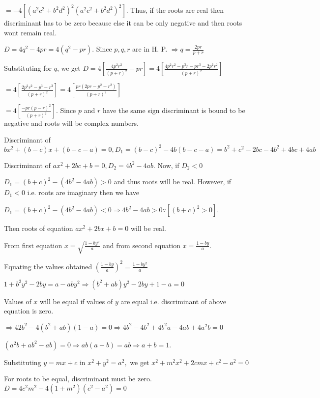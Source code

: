   $= -4[(a^2c^2 + b^2d^2)^2(a^2c^2 + b^2d^2)^2]$. Thus, if the roots are real then discriminant has to be
  zero because else it can be only negative and then roots wont remain real.
\item $D = 4q^2 - 4pr = 4(q^2 - pr)$. Since $p, q, r$ are in H. P. $\Rightarrow q = \frac{2pr}{p + r}$

  Substituting for $q$, we get $D = 4\left[\frac{4p^2r^2}{(p + r)^2} - pr\right] = 4\left[\frac{4p^2r^2 -
      p^3r - pr^3 - 2p^2r^2}{(p + r)^2}\right]$

  $= 4\left[\frac{2p^2r^2 - p^3 - r^3}{(p + r)^2}\right] = 4\left[\frac{pr(2pr - p^2 - r^2)}{(p + r)^2}\right]$

  $= 4\left[\frac{-pr(p - r)^2}{(p + r)^2}\right]$. Since $p$ and $r$ have the same sign discriminant is
  bound to be negative and roots will be complex numbers.
\item Discriminant of $bx^2 + (b - c)x + (b - c - a) = 0, D_1 = (b - c)^2 -4b(b - c - a) = b^2 + c^2 -2bc -4b^2 + 4bc + 4ab$

  Discriminant of $ax^2 + 2bc + b = 0, D_2 = 4b^2 - 4ab$. Now, if $D_2 < 0$

  $D_1 = (b + c)^2 - (4b^2 - 4ab) > 0$ and thus roots will be real. However, if $D_1 < 0$ i.e. roots are imaginary then we have

  $D_1 = (b + c)^2 - (4b^2 - 4ab) < 0 \Rightarrow 4b^2 - 4ab > 0 \because [(b + c)^2 > 0]$.

  Then roots of equation $ax^2 + 2bx + b = 0$ will be real.
\item From first equation $x = \sqrt{\frac{1 - by^2}{a}}$ and from second equation $x = \frac{1 - by}{a}$.

  Equating the values obtained $\left(\frac{1 - by}{a}\right)^2 = \frac{1 - by^2}{a}$

  $1 + b^2y^2 - 2by = a - aby^2 \Rightarrow (b^2 + ab)y^2 - 2by + 1 - a = 0$

  Values of $x$ will be equal if values of $y$ are equal i.e. discriminant of above equation is zero.

  $\Rightarrow 42b^2 - 4(b^2 + ab)(1 - a) = 0 \Rightarrow  4b^2 - 4b^2 + 4b^2a - 4ab + 4a^2b = 0$

  $(a^2b + ab^2 - ab) = 0\Rightarrow ab(a + b) = ab\Rightarrow a + b = 1$.
\item Substituting $y = mx + c$ in $x^2 + y^2 = a^2,$ we get $x^2 + m^2x^2 + 2cmx + c^2 - a^2 = 0$

  For roots to be equal, discriminant must be zero. $D = 4c^2m^2 - 4(1 + m^2)(c^2 - a^2) = 0$

